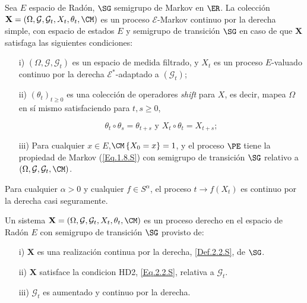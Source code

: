 \begin{Def}\label{Def.2.2.S}
Sea $E$ espacio de Rad\'on, $\SG$ semigrupo de Markov en $\ER$. La colecci\'on $\mathbf{X}=\left(\Omega,\mathcal{G},\mathcal{G}_{t},X_{t},\theta_{t},\CM\right)$ es un proceso $\mathcal{E}$-Markov continuo por la derecha simple, con espacio de estados $E$ y semigrupo de transici\'on $\SG$ en caso de que $\mathbf{X}$ satisfaga las siguientes condiciones:
\begin{itemize}
\item[i)] $\left(\Omega,\mathcal{G},\mathcal{G}_{t}\right)$ es un espacio de medida filtrado, y $X_{t}$ es un proceso $E$-valuado continuo por la derecha $\mathcal{E}^{*}$-adaptado a $\left(\mathcal{G}_{t}\right)$;

\item[ii)] $\left(\theta_{t}\right)_{t\geq0}$ es una colecci\'on de operadores {\em shift} para $X$, es decir, mapea $\Omega$ en s\'i mismo satisfaciendo para $t,s\geq0$,

\begin{equation}\label{Eq.Shift}
\theta_{t}\circ\theta_{s}=\theta_{t+s}\textrm{ y }X_{t}\circ\theta_{t}=X_{t+s};
\end{equation}

\item[iii)] Para cualquier $x\in E$,$\CM\left\{X_{0}=x\right\}=1$, y el proceso $\PE$ tiene la propiedad de Markov (\ref{Eq.1.8.S}) con semigrupo de transici\'on $\SG$ relativo a $\left(\Omega,\mathcal{G},\mathcal{G}_{t},\CM\right)$.
\end{itemize}
\end{Def}

\begin{Def}[HD2]\label{Eq.2.2.S}
Para cualquier $\alpha>0$ y cualquier $f\in S^{\alpha}$, el proceso $t\rightarrow f\left(X_{t}\right)$ es continuo por la derecha casi seguramente.
\end{Def}

\begin{Def}\label{Def.PD}
Un sistema $\mathbf{X}=\left(\Omega,\mathcal{G},\mathcal{G}_{t},X_{t},\theta_{t},\CM\right)$ es un proceso derecho en el espacio de Rad\'on $E$ con semigrupo de transici\'on $\SG$ provisto de:
\begin{itemize}
\item[i)] $\mathbf{X}$ es una realizaci\'on  continua por la derecha, \ref{Def.2.2.S}, de $\SG$.

\item[ii)] $\mathbf{X}$ satisface la condicion HD2, \ref{Eq.2.2.S}, relativa a $\mathcal{G}_{t}$.

\item[iii)] $\mathcal{G}_{t}$ es aumentado y continuo por la derecha.
\end{itemize}
\end{Def}




